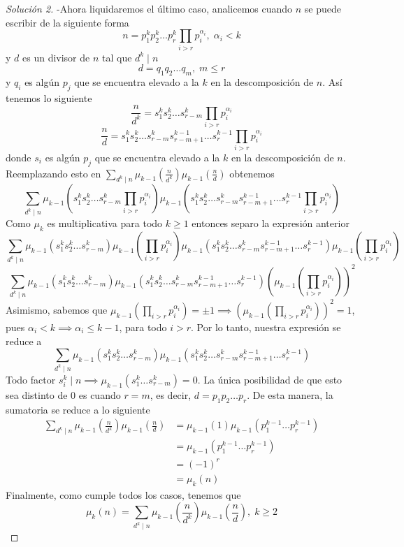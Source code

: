 \documentclass{article}
\theoremstyle{definition}
\theoremstyle{remark}
\begin{document}
\begin{proof}[Soluci\'on 2]
-Ahora liquidaremos el \'ultimo caso, analicemos cuando $n$ se puede escribir de la siguiente forma
$$n = p_1^k p_2^k \dots p_r^k \prod_{i > r}p_i^{\alpha_i},\;\alpha_i < k$$
y $d$ es un divisor de $n$ tal que $d^k \mid n$
$$d = q_1 q_2 \dots q_m,\;m \leq r$$
y $q_i$ es alg\'un $p_j$ que se encuentra elevado a la $k$ en la descomposici\'on de $n$. As\'i tenemos lo siguiente
$$\frac{n}{d^k} = s_1^k s_2^k \dots s_{r - m}^k \prod_{i > r} p_i^{\alpha_i}$$
$$\frac{n}{d} = s_1^k s_2^k \dots s_{r - m}^k s_{r - m + 1}^{k - 1} \dots s_r^{k - 1}\prod_{i > r} p_i^{\alpha_i}$$
donde $s_i$ es alg\'un $p_j$ que se encuentra elevado a la $k$ en la descomposici\'on de $n$. Reemplazando esto en $\sum_{d^k \mid n} \mu_{k-1}\left(\frac{n}{d^k}\right)\mu_{k - 1}\left(\frac{n}{d}\right)$ obtenemos
$$\sum_{d^k \mid n} \mu_{k - 1}(s_1^k s_2^k \dots s_{r - m}^k \prod_{i > r} p_i^{\alpha_i})\mu_{k - 1}(s_1^k s_2^k \dots s_{r - m}^k s_{r - m + 1}^{k - 1} \dots s_r^{k - 1}\prod_{i > r} p_i^{\alpha_i})$$
Como $\mu_k$ es multiplicativa para todo $k \geq 1$ entonces separo la expresi\'on anterior
$$\sum_{d^k \mid n} \mu_{k - 1}(s_1^k s_2^k \dots s_{r - m}^k)\mu_{k-1}(\prod_{i > r} p_i^{\alpha_i})\mu_{k - 1}(s_1^k s_2^k \dots s_{r - m}^k s_{r - m + 1}^{k - 1} \dots s_r^{k - 1})\mu_{k-1}(\prod_{i > r} p_i^{\alpha_i})$$
$$\sum_{d^k \mid n} \mu_{k - 1}(s_1^k s_2^k \dots s_{r - m}^k)\mu_{k - 1}(s_1^k s_2^k \dots s_{r - m}^k s_{r - m + 1}^{k - 1} \dots s_r^{k - 1})(\mu_{k-1}(\prod_{i > r} p_i^{\alpha_i}))^2$$
Asimismo, sabemos que $\mu_{k-1}(\prod_{i > r}p_i^{\alpha_i}) = \pm 1 \implies (\mu_{k-1}(\prod_{i>r}p_i^{\alpha_i}))^2 = 1$, pues $\alpha_i < k \implies \alpha_i \leq k - 1$, para todo $i > r$. Por lo tanto, nuestra expresi\'on se reduce a
$$\sum_{d^k \mid n} \mu_{k - 1}(s_1^k s_2^k \dots s_{r - m}^k)\mu_{k - 1}(s_1^k s_2^k \dots s_{r - m}^k s_{r - m + 1}^{k - 1} \dots s_r^{k - 1})$$
Todo factor $s_i^k \mid n \implies \mu_{k-1}(s_1^k\dots s_{r - m}^k) = 0$. La \'unica posibilidad de que esto sea distinto de $0$ es cuando $r = m$, es decir, $d = p_1 p_2 \dots p_r$. De esta manera, la sumatoria se reduce a lo siguiente
\begin{align*}
    \sum_{d^k \mid n} \mu_{k-1}\left(\frac{n}{d^k}\right)\mu_{k - 1}\left(\frac{n}{d}\right) &= \mu_{k-1}(1)\mu_{k-1}(p_1^{k-1}\dots p_r^{k-1})\\
    &= \mu_{k-1}(p_1^{k-1}\dots p_r^{k-1})\\
    &= (-1)^{r}\\
    &= \mu_k(n)
\end{align*}
Finalmente, como cumple todos los casos, tenemos que
$$\mu_k(n) = \sum_{d^k \mid n} \mu_{k-1}\left(\frac{n}{d^k}\right)\mu_{k - 1}\left(\frac{n}{d}\right),\;k\geq2$$
\end{proof}
\end{document}
